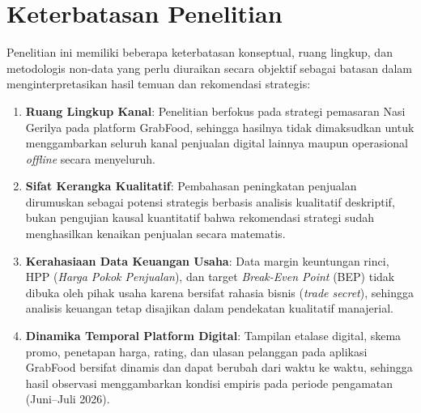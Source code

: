 \section{Keterbatasan Penelitian}

Penelitian ini memiliki beberapa keterbatasan konseptual, ruang lingkup, dan metodologis non-data yang perlu diuraikan secara objektif sebagai batasan dalam menginterpretasikan hasil temuan dan rekomendasi strategis:

\begin{enumerate}
    \item \textbf{Ruang Lingkup Kanal}: Penelitian berfokus pada strategi pemasaran Nasi Gerilya pada platform GrabFood, sehingga hasilnya tidak dimaksudkan untuk menggambarkan seluruh kanal penjualan digital lainnya maupun operasional \textit{offline} secara menyeluruh.
    
    \item \textbf{Sifat Kerangka Kualitatif}: Pembahasan peningkatan penjualan dirumuskan sebagai potensi strategis berbasis analisis kualitatif deskriptif, bukan pengujian kausal kuantitatif bahwa rekomendasi strategi sudah menghasilkan kenaikan penjualan secara matematis.
    
    \item \textbf{Kerahasiaan Data Keuangan Usaha}: Data margin keuntungan rinci, HPP (\textit{Harga Pokok Penjualan}), dan target \textit{Break-Even Point} (BEP) tidak dibuka oleh pihak usaha karena bersifat rahasia bisnis (\textit{trade secret}), sehingga analisis keuangan tetap disajikan dalam pendekatan kualitatif manajerial.
    
    \item \textbf{Dinamika Temporal Platform Digital}: Tampilan etalase digital, skema promo, penetapan harga, rating, dan ulasan pelanggan pada aplikasi GrabFood bersifat dinamis dan dapat berubah dari waktu ke waktu, sehingga hasil observasi menggambarkan kondisi empiris pada periode pengamatan (Juni--Juli 2026).
\end{enumerate}
